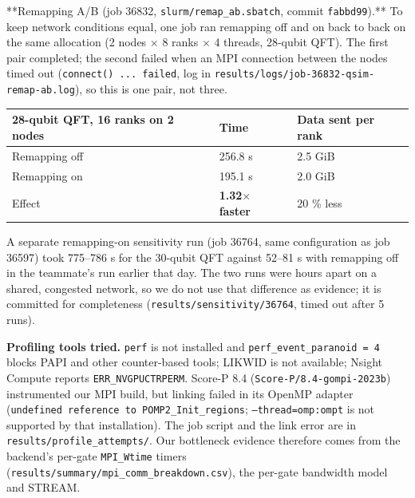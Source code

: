 \documentclass[10pt,a4paper]{article}
\begin{document}
**Remapping A/B (job 36832, \texttt{slurm/remap\_ab.sbatch}, commit \texttt{fabbd99}).** To keep network conditions equal, one job ran remapping off and on back to back on the same allocation (2 nodes $\times$ 8 ranks $\times$ 4 threads, 28-qubit QFT). The first pair completed; the second failed when an MPI connection between the nodes timed out (\texttt{connect() ... failed}, log in \texttt{results/logs/job-36832-qsim-remap-ab.log}), so this is one pair, not three.



\begin{table}[ht]\centering\small
\begin{tabularx}{\linewidth}{@{}XXX@{}}
\toprule
\textbf{28-qubit QFT, 16 ranks on 2 nodes} & \textbf{Time} & \textbf{Data sent per rank} \\
\midrule
Remapping off & 256.8 s & 2.5 GiB \\
Remapping on & 195.1 s & 2.0 GiB \\
Effect & \textbf{1.32$\times$ faster} & 20 \% less \\
\bottomrule
\end{tabularx}
\end{table}



A separate remapping-on sensitivity run (job 36764, same configuration as job 36597) took 775--786 s for the 30-qubit QFT against 52--81 s with remapping off in the teammate's run earlier that day. The two runs were hours apart on a shared, congested network, so we do not use that difference as evidence; it is committed for completeness (\texttt{results/sensitivity/36764}, timed out after 5 runs).



\textbf{Profiling tools tried.} \texttt{perf} is not installed and \texttt{perf\_event\_paranoid = 4} blocks PAPI and other counter-based tools; LIKWID is not available; Nsight Compute reports \texttt{ERR\_NVGPUCTRPERM}. Score-P 8.4 (\texttt{Score-P/8.4-gompi-2023b}) instrumented our MPI build, but linking failed in its OpenMP adapter (\texttt{undefined reference to POMP2\_Init\_regions}; \texttt{--thread=omp:ompt} is not supported by that installation). The job script and the link error are in \texttt{results/profile\_attempts/}. Our bottleneck evidence therefore comes from the backend's per-gate \texttt{MPI\_Wtime} timers (\texttt{results/summary/mpi\_comm\_breakdown.csv}), the per-gate bandwidth model and STREAM.
\end{document}
